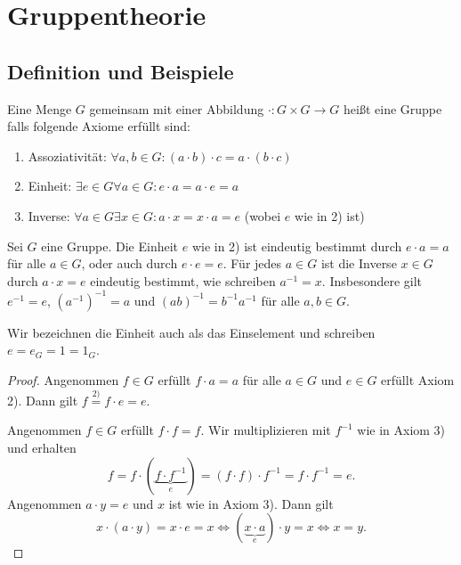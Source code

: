 \graphicspath{{Images/}}

\chapter{Gruppentheorie}
\section{Definition und Beispiele}

\begin{definition}
	Eine Menge $G$ gemeinsam mit einer Abbildung $\cdot : G \times G \to G$ heißt eine Gruppe falls folgende Axiome erfüllt sind:
	\begin{enumerate}[1)]
		\item Assoziativität: $\forall a,b \in G: (a \cdot  b) \cdot  c = a \cdot (b \cdot c)$
		\item Einheit: $\exists e \in G \forall a \in G: e \cdot a = a \cdot e = a$
		\item Inverse: $\forall a \in G \exists x \in G: a \cdot  x = x \cdot a = e$ (wobei $e$ wie in 2) ist)
	\end{enumerate}
\end{definition}

\begin{lemma}
	Sei $G$ eine Gruppe.  Die Einheit $e$ wie in 2) ist eindeutig bestimmt durch $e \cdot  a = a$
	für alle $a \in G$, oder  auch durch $e \cdot e = e$. Für jedes $a \in G$ ist die Inverse $x \in G$ durch
	$a \cdot x = e$ eindeutig bestimmt, wie schreiben $a^{-1} = x$.
	Insbesondere gilt $e^{-1} = e$, $(a^{-1})^{-1} = a$ und $(ab)^{-1} = b^{-1} a^{-1}$ für alle $a,b \in G$.
\end{lemma}

\begin{remark}
	Wir bezeichnen die Einheit auch als das Einselement und schreiben $e = e_{G} = 1 = 1_{G}$.
\end{remark}

\begin{proof}
	Angenommen $f \in G$ erfüllt $f \cdot a = a$ für alle $a \in G$ und $e \in G$ erfüllt Axiom 2).
	Dann gilt $f \stackrel{2)}{=} f \cdot e = e$.

	Angenommen $f \in G$ erfüllt $f \cdot f = f$. Wir multiplizieren mit $f^{-1}$ wie in Axiom 3) und erhalten
	\[
		f = f \cdot (\underbrace{f \cdot f^{-1}}_{e}) = (f \cdot f) \cdot f^{-1} = f \cdot f^{-1}= e
	.\] 
	Angenommen $a \cdot y = e$ und $x$ ist wie in Axiom 3). Dann gilt
	\[
		x \cdot (a \cdot y) = x \cdot e = x \Leftrightarrow (\underbrace{x\cdot a}_{e} ) \cdot y = x \Leftrightarrow x = y
	.\] 
\end{proof}

